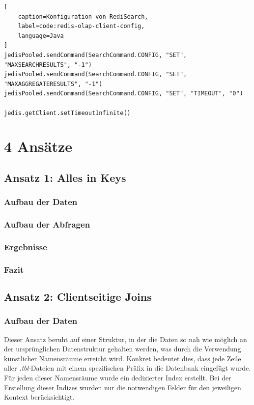 \begin{lstlisting}[
    caption=Konfiguration von RediSearch,
    label=code:redis-olap-client-config,
    language=Java
]
jedisPooled.sendCommand(SearchCommand.CONFIG, "SET", "MAXSEARCHRESULTS", "-1")
jedisPooled.sendCommand(SearchCommand.CONFIG, "SET", "MAXAGGREGATERESULTS", "-1")
jedisPooled.sendCommand(SearchCommand.CONFIG, "SET", "TIMEOUT", "0")

jedis.getClient.setTimeoutInfinite()
\end{lstlisting}

\section{4 Ansätze}
\subsection{Ansatz 1: Alles in Keys}
\subsubsection{Aufbau der Daten}
\subsubsection{Aufbau der Abfragen}
\subsubsection{Ergebnisse}
\subsubsection{Fazit}


\subsection{Ansatz 2: Clientseitige Joins}

\subsubsection{Aufbau der Daten}\label{sec:client-approach-datastructure}
Dieser Ansatz beruht auf einer Struktur, in der die Daten so nah wie möglich an der ursprünglichen Datenstruktur gehalten werden, was durch die Verwendung künstlicher Namensräume erreicht wird. Konkret bedeutet dies, dass jede Zeile aller \emph{.tbl}-Dateien mit einem spezifischen Präfix in die Datenbank eingefügt wurde. Für jeden dieser Namensräume wurde ein dedizierter Index erstellt. Bei der Erstellung dieser Indizes wurden nur die notwendigen Felder für den jeweiligen Kontext berücksichtigt.

